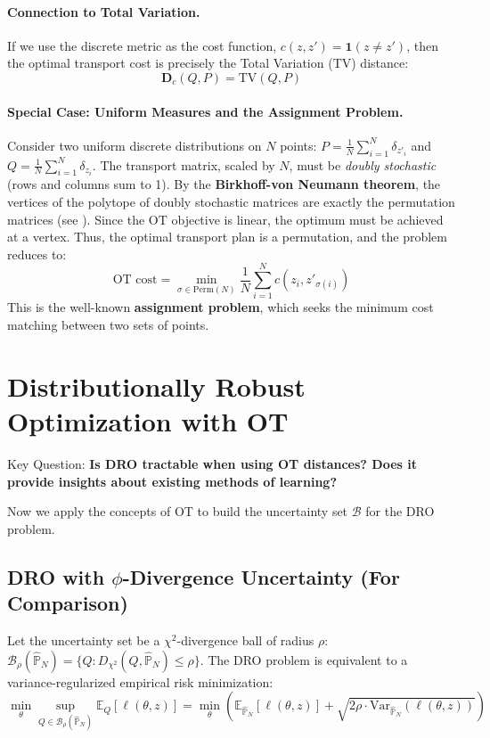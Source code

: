\documentclass[12pt]{report}
\begin{document}
\paragraph{Connection to Total Variation.}
If we use the discrete metric as the cost function, $c(z, z') = \mathbf{1}(z \neq z')$, then the optimal transport cost is precisely the Total Variation (TV) distance:
\[
\textbf{D}_c(Q, P) = \text{TV}(Q, P)
\]

\paragraph{Special Case: Uniform Measures and the Assignment Problem.}

Consider two uniform discrete distributions on $N$ points: $P = \frac{1}{N} \sum_{i=1}^N \delta_{z'_i}$ and $Q = \frac{1}{N} \sum_{i=1}^N \delta_{z_i}$. 
The transport matrix, scaled by $N$, must be \textit{doubly stochastic} (rows and columns sum to 1). 
By the \textbf{Birkhoff-von Neumann theorem}, the vertices of the polytope of doubly stochastic matrices are exactly the permutation matrices (see \cite{villani2009optimal}). 
Since the OT objective is linear, the optimum must be achieved at a vertex. Thus, the optimal transport plan is a permutation, and the problem reduces to:
\[
\text{OT cost} = \min_{\sigma \in \text{Perm}(N)} \frac{1}{N} \sum_{i=1}^N c(z_i, z'_{\sigma(i)})
\]
This is the well-known \textbf{assignment problem}, which seeks the minimum cost matching between two sets of points.

\section{Distributionally Robust Optimization with OT}
\noindent Key Question: \textbf{Is DRO tractable when using OT distances? Does it provide insights about existing methods of learning?}

Now we apply the concepts of OT to build the uncertainty set $\mathcal{B}$ for the DRO problem.

\subsection{DRO with $\phi$-Divergence Uncertainty (For Comparison)}

\begin{theorem}

Let the uncertainty set be a $\chi^2$-divergence ball of radius $\rho$: $\mathcal{B}_\rho(\hat{\mathbb{P}}_N) = \{ Q : D_{\chi^2}(Q, \hat{\mathbb{P}}_N) \le \rho \}$. 
The DRO problem is equivalent to a variance-regularized empirical risk minimization:
\[
\min_\theta \sup_{Q \in \mathcal{B}_\rho(\hat{\mathbb{P}}_N)} \mathbb{E}_Q[\ell(\theta, z)] = \min_\theta \left( \mathbb{E}_{\hat{\mathbb{P}}_N}[\ell(\theta, z)] + \sqrt{2\rho \cdot \text{Var}_{\hat{\mathbb{P}}_N}(\ell(\theta, z))} \right)
\]
\end{theorem}
\end{document}
